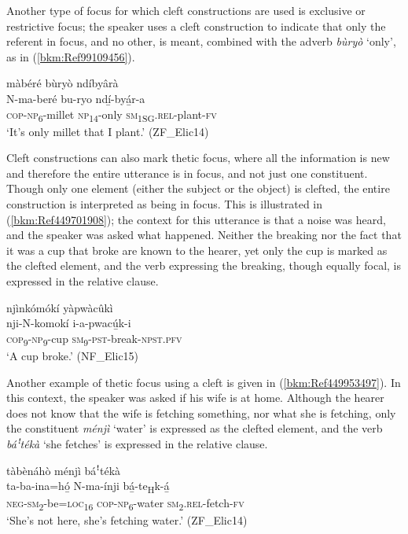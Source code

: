 Another type of focus for which cleft constructions are used is exclusive or restrictive focus; the speaker uses a cleft construction to indicate that only the referent in focus, and no other, is meant, combined with the adverb \textit{bùryò} ‘only’, as in (\ref{bkm:Ref99109456}).

\ea
\label{bkm:Ref99109456}
màbéré bùryò ndíbyârà\\
\gll N-ma-beré    bu-ryo  ndí̲-byá̲r-a\\
\textsc{cop}-\textsc{np}\textsubscript{6}-millet  \textsc{np}\textsubscript{14}-only  \textsc{sm}\textsubscript{1SG}.\textsc{rel}-plant-\textsc{fv}\\
\glt ‘It’s only millet that I plant.’ (ZF\_Elic14)
\z

Cleft constructions can also mark thetic focus, where all the information is new and therefore the entire utterance is in focus, and not just one constituent. Though only one element (either the subject or the object) is clefted, the entire construction is interpreted as being in focus. This is illustrated in (\ref{bkm:Ref449701908}); the context for this utterance is that a noise was heard, and the speaker was asked what happened. Neither the breaking nor the fact that it was a cup that broke are known to the hearer, yet only the cup is marked as the clefted element, and the verb expressing the breaking, though equally focal, is expressed in the relative clause.

\ea
\label{bkm:Ref449701908}
njìnkómókí yàpwàcûkì\\
\gll nji-N-komokí  i-a-pwacú̲k-i\\
\textsc{cop}\textsubscript{9}-\textsc{np}\textsubscript{9}-cup  \textsc{sm}\textsubscript{9}-\textsc{pst}-break-\textsc{npst}.\textsc{pfv}\\
\glt ‘A cup broke.’ (NF\_Elic15)
\z

Another example of thetic focus using a cleft is given in (\ref{bkm:Ref449953497}). In this context, the speaker was asked if his wife is at home. Although the hearer does not know that the wife is fetching something, nor what she is fetching, only the constituent \textit{ménjì} ‘water’ is expressed as the clefted element, and the verb \textit{báꜝ}\textit{tékà} ‘she fetches’ is expressed in the relative clause.

\ea
\label{bkm:Ref449953497}
tàbènáhò ménjì báꜝtékà\\
\gll ta-ba-ina=hó̲    N-ma-ínji    bá̲-te\textsubscript{H}k-á̲\\
\textsc{neg}-\textsc{sm}\textsubscript{2}-be=\textsc{loc}\textsubscript{16}  \textsc{cop}-\textsc{np}\textsubscript{6}-water  \textsc{sm}\textsubscript{2}.\textsc{rel}-fetch-\textsc{fv}\\
\glt ‘She’s not here, she’s fetching water.’ (ZF\_Elic14)
\z

